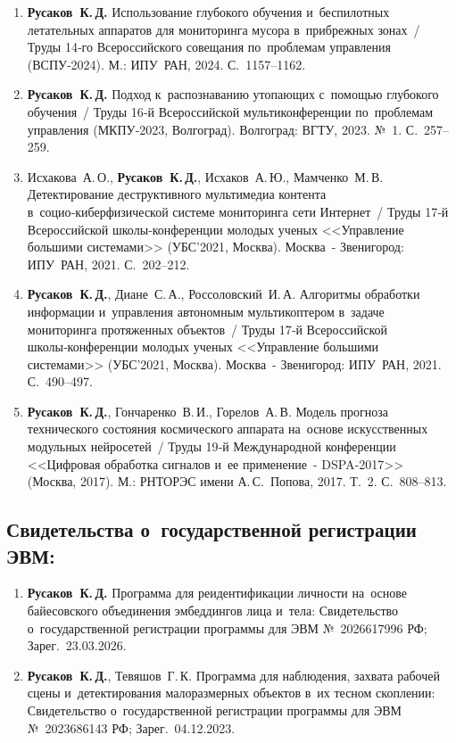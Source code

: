 \begin{enumerate}[resume]
    \item \textbf{Русаков~К.\,Д.} Использование глубокого обучения
          и~беспилотных летательных аппаратов для мониторинга мусора
          в~прибрежных зонах~/ Труды 14‑го Всероссийского совещания
          по~проблемам управления (ВСПУ‑2024). М.: ИПУ~РАН, 2024. С.~1157--1162.
    \item \textbf{Русаков~К.\,Д.} Подход к~распознаванию утопающих с~помощью
          глубокого обучения~/ Труды 16‑й Всероссийской мультиконференции
          по~проблемам управления (МКПУ‑2023, Волгоград). Волгоград: ВГТУ, 2023.
          №~1. С.~257--259.
    \item Исхакова~А.\,О., \textbf{Русаков~К.\,Д.}, Исхаков~А.\,Ю.,
          Мамченко~М.\,В. Детектирование деструктивного мультимедиа контента
          в~социо‑киберфизической системе мониторинга сети Интернет~/ Труды
          17‑й Всероссийской школы‑конференции молодых ученых <<Управление
          большими системами>> (УБС'2021, Москва). Москва~- Звенигород:
          ИПУ~РАН, 2021. С.~202--212.
    \item \textbf{Русаков~К.\,Д.}, Диане~С.\,А., Россоловский~И.\,А. Алгоритмы
          обработки информации и~управления автономным мультикоптером в~задаче
          мониторинга протяженных объектов~/ Труды 17‑й Всероссийской
          школы‑конференции молодых ученых <<Управление большими системами>>
          (УБС'2021, Москва). Москва~- Звенигород: ИПУ~РАН, 2021.
          С.~490--497.
    \item \textbf{Русаков~К.\,Д.}, Гончаренко~В.\,И., Горелов~А.\,В. Модель
          прогноза технического состояния космического аппарата на~основе
          искусственных модульных нейросетей~/ Труды 19‑й Международной
          конференции <<Цифровая обработка сигналов и~ее применение~-
          DSPA‑2017>> (Москва, 2017). М.: РНТОРЭС имени А.\,С.~Попова, 2017.
          Т.~2. С.~808--813.
\end{enumerate}

\subsection*{Свидетельства о~государственной регистрации ЭВМ:}

\begin{enumerate}[resume]
    \item \textbf{Русаков~К.\,Д.} Программа для реидентификации личности
          на~основе байесовского объединения эмбеддингов лица и~тела:
          Свидетельство о~государственной регистрации программы для ЭВМ
          №~2026617996 РФ; Зарег.~23.03.2026.
    \item \textbf{Русаков~К.\,Д.}, Тевяшов~Г.\,К. Программа для наблюдения,
          захвата рабочей сцены и~детектирования малоразмерных объектов в~их
          тесном скоплении: Свидетельство о~государственной регистрации программы
          для ЭВМ №~2023686143 РФ; Зарег.~04.12.2023.
\end{enumerate}

